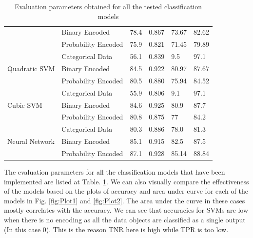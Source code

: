 \documentclass{article} %
\begin{document}
\begin{table}[H]
{\begin{tabular}{|l|l|l|l|l|l|}
					& Binary Encoded                                             & 78.4             & 0.867            & 73.67       & 82.62      \\ \cline{2-6} 
					& Probability Encoded                                        & 75.9             & 0.821            & 71.45       & 79.89      \\ \hline
					\multirow{3}{*}{Quadratic SVM}                                   & Categorical Data                                           & 56.1             & 0.839            & 9.5         & 97.1       \\ \cline{2-6} 
					& Binary Encoded                                             & 84.5             & 0.922            & 80.97       & 87.67      \\ \cline{2-6} 
					& Probability Encoded                                        & 80.5             & 0.880            & 75.94       & 84.52      \\ \hline
					\multirow{3}{*}{Cubic SVM}                                       & Categorical Data                                           & 55.9             & 0.806            & 9.1         & 97.1       \\ \cline{2-6} 
					& Binary Encoded                                             & 84.6             & 0.925            & 80.9        & 87.7       \\ \cline{2-6} 
					& Probability Encoded                                        & 80.8             & 0.875            & 77          & 84.2       \\ \hline
					\multirow{3}{*}{Neural Network}                                  & Categorical Data                                           & 80.3             & 0.886            & 78.0        & 81.3       \\ \cline{2-6} 
					& Binary Encoded                                             & 85.1             & 0.915            & 82.5        & 87.5       \\ \cline{2-6} 
					& Probability Encoded                                        & 87.1             & 0.928            & 85.14       & 88.84      \\ \hline
				\end{tabular}
			}
			\caption{Evaluation parameters obtained for all the tested classification models}
			\label{table:Table1}
		\end{table}
		
			The evaluation parameters for all the classification models that have been implemented are listed at Table. \ref{table:Table1}. We can also visually compare the effectiveness of the models based on the plots of accuracy and area under curve for each of the models in  Fig. \ref{fig:Plot1} and \ref{fig:Plot2}. The area under the curve in these cases mostly correlates with the accuracy. We can see that accuracies for SVMs are low when there is no encoding as all the data objects are classified as a single output (In this case 0). This is the reason TNR here is high while TPR is too low. 	
	
\end{document}
